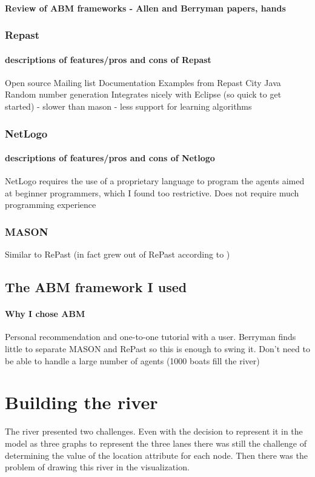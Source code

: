       \paragraph{Review of ABM frameworks - Allen and Berryman papers, hands}
      \subsubsection{Repast}
        \paragraph{descriptions of features/pros and cons of Repast}
        Open source
        Mailing list
        Documentation
        Examples from Repast City
        Java
        Random number generation
        Integrates nicely with Eclipse (so quick to get started)
        - slower than mason
        - less support for learning algorithms
      \subsubsection{NetLogo}
        \paragraph{descriptions of features/pros and cons of Netlogo}
        NetLogo requires the use of a proprietary
        language to program the agents aimed at beginner programmers, which I
        found too restrictive.
        Does not require much programming experience
        
      \subsubsection{MASON}
        Similar to RePast (in fact grew out of RePast according to )
    \subsection{The ABM framework I used}
      \paragraph{Why I chose ABM}
      Personal recommendation and one-to-one tutorial with a user. Berryman finds little to separate MASON and RePast so this is enough to swing it.
      Don't need to be able to handle a large number of agents (1000 boats fill the river)
      
  \section{Building the river}
    The river presented two challenges. Even with the decision to represent it in the model as three graphs to represent the three lanes there was still the challenge of determining the value of the location attribute for each node. Then there was the problem of drawing this river in the visualization.
    
